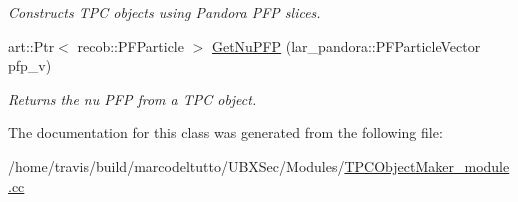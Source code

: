 \begin{DoxyCompactItemize}
\begin{DoxyCompactList}\small\item\em \-Constructs \-T\-P\-C objects using \-Pandora \-P\-F\-P slices. \end{DoxyCompactList}\item 
art\-::\-Ptr$<$ recob\-::\-P\-F\-Particle $>$ \hyperlink{group__UBXSec_ga6a47470b5f5690a3626e14bc9f6f360c}{\-Get\-Nu\-P\-F\-P} (lar\-\_\-pandora\-::\-P\-F\-Particle\-Vector pfp\-\_\-v)
\begin{DoxyCompactList}\small\item\em \-Returns the nu \-P\-F\-P from a \-T\-P\-C object. \end{DoxyCompactList}\end{DoxyCompactItemize}


\-The documentation for this class was generated from the following file\-:\begin{DoxyCompactItemize}
\item 
/home/travis/build/marcodeltutto/\-U\-B\-X\-Sec/\-Modules/\hyperlink{TPCObjectMaker__module_8cc}{\-T\-P\-C\-Object\-Maker\-\_\-module.\-cc}\end{DoxyCompactItemize}
